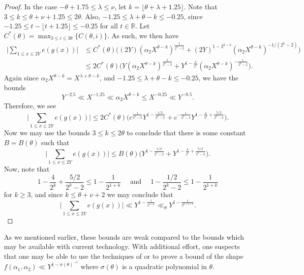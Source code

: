 \documentclass[11pt,reqno]{amsart}
\numberwithin{equation}{section}
\begin{document}
\begin{proof}
In the case $-\theta+1.75 \leq \lambda \leq \nu$, let $k = \lfloor \theta+\lambda +1.25 \rfloor $. Note that $3 \leq k \leq \theta+\nu+1.25 \leq 2\theta$. Also, $-1.25 \leq \lambda+\theta-k \leq -0.25$, since $-1.25 \leq t-
\lfloor t+1.25 \rfloor \leq -0.25 $ for all $t \in \mathbb{R}$. Let $C^*(\theta) = \max_{3 \leq i \leq 3\theta} \{C(\theta, i)\}$. As such, we then have 
\begin{align*}
\Big|\sum_{1 \leq x \leq 2Y} e(g(x)) \Big| & \leq  C^*(\theta) \big( (2Y)(\alpha_2X^{\theta-k})^{\frac{1}{2^k-2}} + (2Y)^{1-2^{2-k}} (\alpha_2 X^{\theta-k})^{-1/(2^k-2)} \big) 
\\ & \leq  2C^*(\theta)\big( Y(\alpha_2X^{\theta-k})^{\frac{1}{2^k-2}} + Y^{1-\frac{4}{2^k}}(\alpha_2X^{\theta-k})^{-\frac{1}{2^k-2}} \big).  
\end{align*}
Again since $ \alpha_2X^{\theta-k} = X^{\lambda+\theta-k}$, and $-1.25 \leq\lambda+\theta-k \leq -0.25$, we have the bounds 
\[ Y^{-2.5} \ll X^{-1.25} \ll  \alpha_2X^{\theta-k} \leq X^{-0.25} \ll  Y^{-0.5}. \]
Therefore, we see 
\[ \Big|\sum_{1 \leq x \leq 2Y} e(g(x)) \Big| \leq 2C^*(\theta) \big( c^{\frac{1}{2^k-2}} Y^{1-\frac{1/2}{2^k-2}} + c^{-\frac{1}{2^k-2}} Y^{1-\frac{4}{2^k}+\frac{5/2}{2^k-2}} \big). \]
Now we may use the bounds $3 \leq k \leq 2\theta$ to conclude that there is some constant $B = B(\theta)$ such that 
\[ \Big|\sum_{1 \leq x \leq 2Y} e(g(x))\Big| \leq B(\theta) \big(Y^{1-\frac{1/2}{2^k-2}} + Y^{1-\frac{4}{2^k}+\frac{5/2}{2^k-2}} \big). \]
Now, note that 
\[ 1-\frac{4}{2^k}+\frac{5/2}{2^k-2} \leq 1-\frac{1}{2^{1+k}} \quad \text{ and } \quad 1-\frac{1/2}{2^k-2} \leq 1-\frac{1}{2^{1+k}}\] 
for $k \geq 3$, and since $k \leq \theta+\nu+2$ we may conclude that 
\[ \Big|\sum_{1 \leq x \leq 2Y} e(g(x))\Big| \ll Y^{1-\frac{1}{2^{1+k}}} \ll_{\theta} Y^{1-\frac{1}{2^{\theta+\nu+3}}}. \]
\end{proof} 


As we mentioned earlier, these bounds are weak compared to the bounds which may be available with current technology. With additional effort, one suspects that one may be able to use the techniques of \cite{Kuf} or \cite{Vino} to prove a bound of the shape $f(\alpha_1,\alpha_2) \ll Y^{1-\sigma(\theta)^{-1}}$ where $\sigma(\theta)$ is a quadratic polynomial in $\theta$. 
\end{document}
